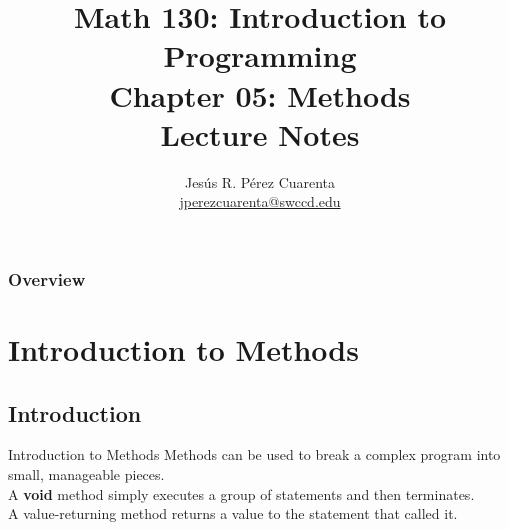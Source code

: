 \documentclass[11pt]{beamer}
\title[Chapter 05 Notes]{Math 130: Introduction to Programming \\ Chapter 05: Methods \\ Lecture Notes}
\author{Jesús R. Pérez Cuarenta \\
\href{mailto:jperezcuarenta@swccd.edu}{jperezcuarenta@swccd.edu}
}
\date{} %
\begin{document}
% 
% 

\begin{frame}
  \maketitle
\end{frame}

\begin{frame}
\frametitle{Overview}
    \tableofcontents
\end{frame}

\section{Introduction to Methods}
\subsection{Introduction}
\begin{frame}{Introduction to Methods}
    Methods can be used to break a complex program into small, manageable pieces. \\ 
    \vspace{1em} 
    A \textbf{void} method simply executes a group of statements and then terminates. \\ 
    \vspace{1em} 
    A value-returning method returns a value to the statement that called it.        
\end{frame}
\end{document}
